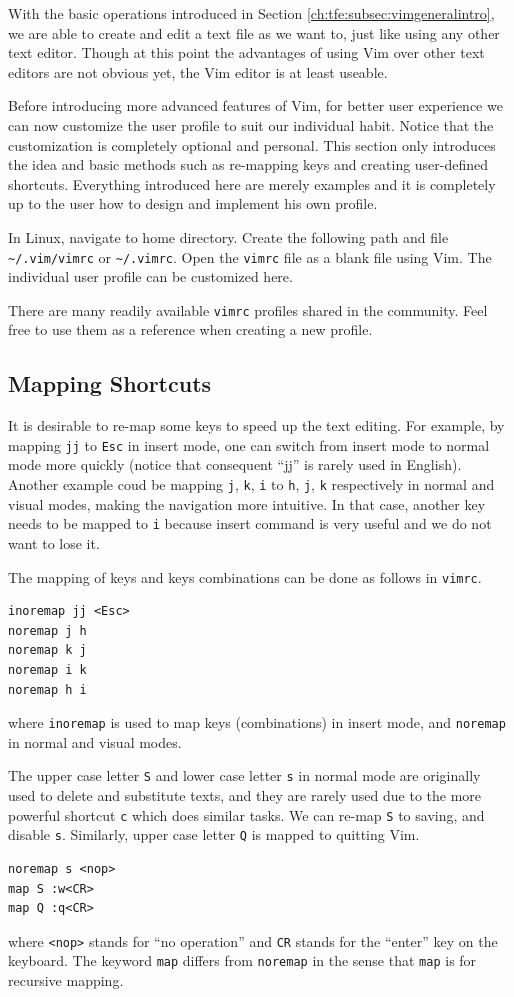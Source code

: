 With the basic operations introduced in Section \ref{ch:tfe:subsec:vimgeneralintro}, we are able to create and edit a text file as we want to, just like using any other text editor. Though at this point the advantages of using Vim over other text editors are not obvious yet, the Vim editor is at least useable.

Before introducing more advanced features of Vim, for better user experience we can now customize the user profile to suit our individual habit. Notice that the customization is completely optional and personal. This section only introduces the idea and basic methods such as re-mapping keys and creating user-defined shortcuts. Everything introduced here are merely examples and it is completely up to the user how to design and implement his own profile.

In Linux, navigate to home directory. Create the following path and file \verb|~/.vim/vimrc| or \verb|~/.vimrc|. Open the \verb|vimrc| file as a blank file using Vim. The individual user profile can be customized here.

There are many readily available \verb|vimrc| profiles shared in the community. Feel free to use them as a reference when creating a new profile.

\subsection{Mapping Shortcuts}

It is desirable to re-map some keys to speed up the text editing. For example, by mapping \verb|jj| to \verb|Esc| in insert mode, one can switch from insert mode to normal mode more quickly (notice that consequent ``jj'' is rarely used in English). Another example coud be mapping \verb|j|, \verb|k|, \verb|i| to \verb|h|, \verb|j|, \verb|k| respectively in normal and visual modes, making the navigation more intuitive. In that case, another key needs to be mapped to \verb|i| because insert command is very useful and we do not want to lose it.

The mapping of keys and keys combinations can be done as follows in \verb|vimrc|.
\begin{lstlisting}
inoremap jj <Esc>
noremap j h
noremap k j
noremap i k
noremap h i
\end{lstlisting}
where \verb|inoremap| is used to map keys (combinations) in insert mode, and \verb|noremap| in normal and visual modes.

The upper case letter \verb|S| and lower case letter \verb|s| in normal mode are originally used to delete and substitute texts, and they are rarely used due to the more powerful shortcut \verb|c| which does similar tasks. We can re-map \verb|S| to saving, and disable \verb|s|. Similarly, upper case letter \verb|Q| is mapped to quitting Vim.
\begin{lstlisting}
noremap s <nop>
map S :w<CR>
map Q :q<CR>
\end{lstlisting}
where \verb|<nop>| stands for ``no operation'' and \verb|CR| stands for the ``enter'' key on the keyboard. The keyword \verb|map| differs from \verb|noremap| in the sense that \verb|map| is for recursive mapping.

